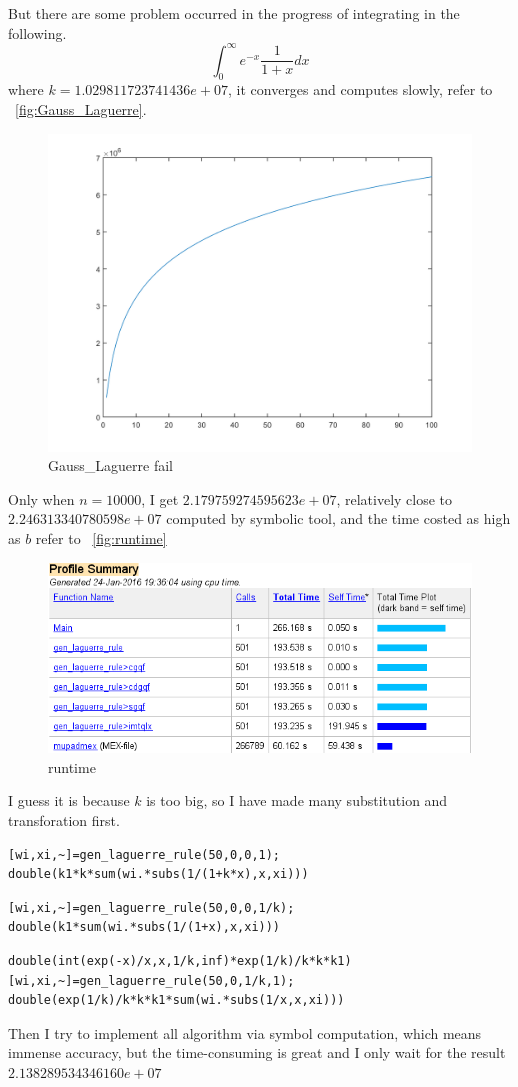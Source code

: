 \documentclass[
10pt, %
a4paper, %
oneside, %
headinclude,footinclude, %
BCOR5mm, %
]{scrartcl}
\theoremstyle{definition}
\begin{document}
But there are some problem occurred in the progress of integrating in the following.  \[\int_{0}^{\infty}e^{-x}\frac{1}{1+x}dx\] where $k=1.029811723741436e+07$, it converges and  computes slowly, refer to ~\vref{fig:Gauss_Laguerre}.
 \begin{figure}[tb]
\centering
\includegraphics[width=.5\columnwidth]{./fig/Gauss_Laguerre.png}
\caption[Gauss\_Laguerre fail]{Gauss\_Laguerre fail}
\label{fig:Gauss_Laguerre}\end{figure}
Only when $n = 10000$, I get $2.179759274595623e+07
$, relatively close to $ 2.246313340780598e+07$ computed by symbolic tool,
and the time costed as high as $ b$ refer to ~\vref{fig:runtime}
\begin{figure}[tb]
\centering
\includegraphics[width=.5\columnwidth]{./fig/runtime.png}
\caption[runtime]{runtime}
\label{fig:runtime}\end{figure}

I guess it is because $k$ is too big, so I have made many substitution and transforation first.
\begin{lstlisting}
[wi,xi,~]=gen_laguerre_rule(50,0,0,1);
double(k1*k*sum(wi.*subs(1/(1+k*x),x,xi)))
\end{lstlisting}

\begin{lstlisting}
[wi,xi,~]=gen_laguerre_rule(50,0,0,1/k);
double(k1*sum(wi.*subs(1/(1+x),x,xi)))
\end{lstlisting}

\begin{lstlisting}
double(int(exp(-x)/x,x,1/k,inf)*exp(1/k)/k*k*k1)
[wi,xi,~]=gen_laguerre_rule(50,0,1/k,1);
double(exp(1/k)/k*k*k1*sum(wi.*subs(1/x,x,xi)))
\end{lstlisting}
Then I try to implement all algorithm  via symbol computation, which means immense accuracy, but the time-consuming is great and I only wait for the result $2.138289534346160e+07$
\end{document}
